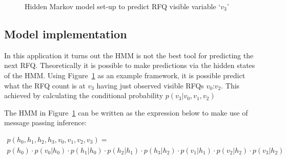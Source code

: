 
\begin{figure}[!ht]\centering
    \caption{Hidden Markov model set-up to predict RFQ visible variable `$v_3$'}\label{Ch7Fig:9}
\end{figure}



\subsection{Model implementation}

In this application it turns out the HMM is not the best tool for predicting the next RFQ. Theoretically it is possible to make predictions via the hidden states of the HMM. Using Figure~\ref{Ch7Fig:9} as an example framework, it is possible predict what the RFQ count is at $v_3$ having just observed visible RFQs $v_0\text{:}v_2$. This achieved by calculating the conditional probability $p(v_3| v_0,v_1,v_2)$

The HMM in Figure~\ref{Ch7Fig:9} can be written as the expression below to make use of message passing inference:

\begin{multline}
    p(h_0,h_1,h_2,h_3,v_0,v_1,v_2,v_3) =\\
    p (h_0)     \!\!\cdot\!\!
    p (v_0|h_0) \!\!\cdot\!\!
    p (h_1|h_0) \!\!\cdot\!\!
    p (h_2|h_1) \!\!\cdot\!\!
    p (h_3|h_2) \!\!\cdot\!\!
    p (v_1|h_1) \!\!\cdot\!\!
    p (v_2|h_2) \!\!\cdot\!\!
    p (v_3|h_2)
\end{multline}

